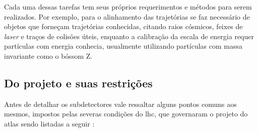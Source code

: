 Cada uma dessas tarefas tem seus próprios requerimentos e métodos para serem
realizados. Por exemplo, para o alinhamento das trajetórias se faz necessário de
objetos que forneçam trajetórias conhecidas, citando raios cósmicos, feixes de \emph{laser} 
e traços de colisões úteis, enquanto a calibração da
escala de energia requer partículas com energia conhecia, usualmente
utilizando partículas com massa invariante como o bóssom Z.

\subsection{Do projeto e suas restrições}
\label{ssec:atlas_restr}

Antes de detalhar os subdetectores vale ressaltar alguns pontos comuns aos
mesmos, impostos pelas severas condições do \gls{lhc}, que 
governaram o projeto do \gls{atlas} sendo listadas a seguir \cite{THESIS_LAR}:



